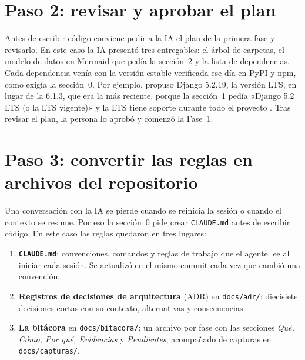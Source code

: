 \documentclass[stu,12pt,floatsintext]{apa7}
\newcommand{\ruta}[1]{{\urlstyle{tt}\nolinkurl{#1}}}
\begin{document}
\section{Paso 2: revisar y aprobar el plan}

Antes de escribir código conviene pedir a la IA el plan de la primera fase y revisarlo. En este caso la
IA presentó tres entregables: el árbol de carpetas, el modelo de datos en Mermaid que pedía la
sección~2 y la lista de dependencias. Cada dependencia venía con
la versión estable verificada ese día en PyPI y npm, como exigía la sección~0. Por ejemplo, propuso
Django 5.2.19, la versión LTS, en lugar de la 6.1.3, que era la más reciente, porque la sección~1 pedía
«Django 5.2 LTS (o la LTS vigente)» y la LTS tiene soporte durante todo el proyecto
\parencite{django2025}. Tras revisar el plan, la persona lo aprobó y comenzó la Fase~1.

\section{Paso 3: convertir las reglas en archivos del repositorio}

Una conversación con la IA se pierde cuando se reinicia la sesión o cuando el contexto se resume. Por
eso la sección~0 pide crear \ruta{CLAUDE.md} antes de escribir código. En este caso las reglas quedaron
en tres lugares:

\begin{enumerate}[leftmargin=0.5in]
  \item \textbf{\ruta{CLAUDE.md}}: convenciones, comandos y reglas de trabajo que el agente lee al iniciar
        cada sesión. Se actualizó en el mismo commit cada vez que cambió una convención.
  \item \textbf{Registros de decisiones de arquitectura} (ADR) en \ruta{docs/adr/}: diecisiete decisiones
        cortas con su contexto, alternativas y consecuencias.
  \item \textbf{La bitácora} en \ruta{docs/bitacora/}: un archivo por fase con las secciones \textit{Qué,
        Cómo, Por qué, Evidencias} y \textit{Pendientes}, acompañado de capturas en \ruta{docs/capturas/}.
\end{enumerate}
\end{document}
